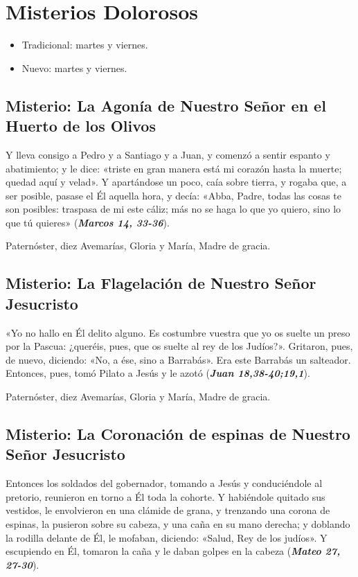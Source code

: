 \documentclass[./main.tex]{subfiles}
\newcounter{sorrowful-counter}
\begin{document}
\section*{Misterios Dolorosos}
\begin{itemize}
      \item Tradicional: martes y viernes.
      \item Nuevo: martes y viernes.
\end{itemize}

\subsection*{ Misterio: La Agonía de Nuestro Señor en el Huerto de los Olivos}
Y lleva consigo a Pedro y a Santiago y a Juan, y comenzó a sentir espanto y abatimiento; y le dice:
«triste en gran manera está mi corazón hasta la muerte; quedad aquí y velad». Y apartándose un poco,
caía sobre tierra, y rogaba que, a ser posible, pasase el Él aquella hora, y decía: «Abba, Padre, todas las cosas te son posibles:
traspasa de mi este cáliz; más no se haga lo que yo quiero, sino lo que tú quieres» (\textbf{\emph{Marcos 14, 33-36}}).

\begin{center}
      Paternóster, diez Avemarías, Gloria y María, Madre de gracia.
\end{center}

\subsection*{ Misterio: La Flagelación de Nuestro Señor Jesucristo}
«Yo no hallo en Él delito alguno. Es costumbre vuestra que yo os suelte un preso por la Pascua:
¿queréis, pues, que os suelte al rey de los Judíos?». Gritaron, pues, de nuevo, diciendo: «No, a ése, sino a Barrabás».
Era este Barrabás un salteador. Entonces, pues, tomó Pilato a Jesús y le azotó (\textbf{\emph{Juan 18,38-40;19,1}}).

\begin{center}
      Paternóster, diez Avemarías, Gloria y María, Madre de gracia.
\end{center}

\subsection*{ Misterio: La Coronación de espinas de Nuestro Señor Jesucristo}
Entonces los soldados del gobernador, tomando a Jesús y conduciéndole al pretorio, reunieron en torno a Él toda la cohorte. 
Y habiéndole quitado sus vestidos, le envolvieron en una clámide de grana, y trenzando una corona de espinas, 
la pusieron sobre su cabeza, y una caña en su mano derecha; y doblando la rodilla delante de Él, 
le mofaban, diciendo: «Salud, Rey de los judíos». Y escupiendo en Él, tomaron la caña y le daban golpes en la cabeza (\textbf{\emph{Mateo 27, 27-30}}).
\end{document}
